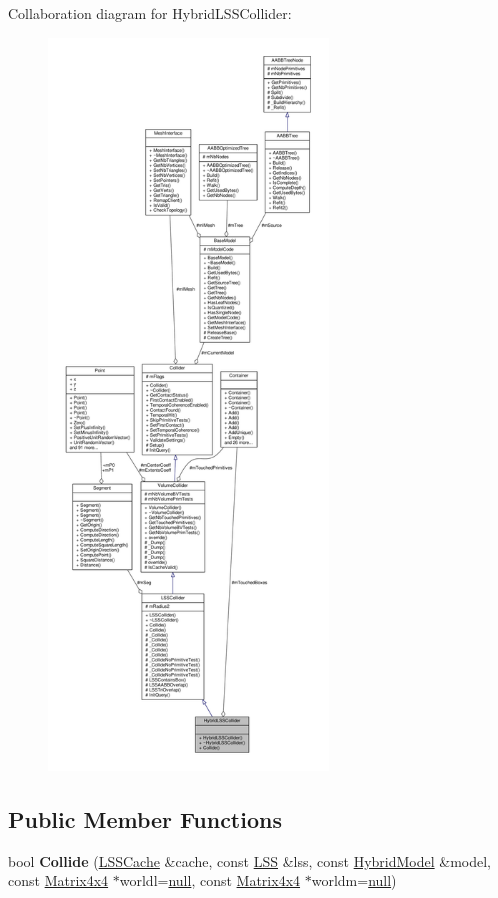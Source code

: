 Collaboration diagram for Hybrid\+L\+S\+S\+Collider\+:
\nopagebreak
\begin{figure}[H]
\begin{center}
\leavevmode
\includegraphics[height=550pt]{d3/d99/classHybridLSSCollider__coll__graph}
\end{center}
\end{figure}
\subsection*{Public Member Functions}
\begin{DoxyCompactItemize}
\item 
bool {\bfseries Collide} (\hyperlink{structLSSCache}{L\+S\+S\+Cache} \&cache, const \hyperlink{classLSS}{L\+SS} \&lss, const \hyperlink{classHybridModel}{Hybrid\+Model} \&model, const \hyperlink{classMatrix4x4}{Matrix4x4} $\ast$worldl=\hyperlink{IceTypes_8h_ac97b8ee753e4405397a42ad5799b0f9e}{null}, const \hyperlink{classMatrix4x4}{Matrix4x4} $\ast$worldm=\hyperlink{IceTypes_8h_ac97b8ee753e4405397a42ad5799b0f9e}{null})\hypertarget{classHybridLSSCollider_ab66b69917863c7fb1dc5229401ce9def}{}\label{classHybridLSSCollider_ab66b69917863c7fb1dc5229401ce9def}

\end{DoxyCompactItemize}
